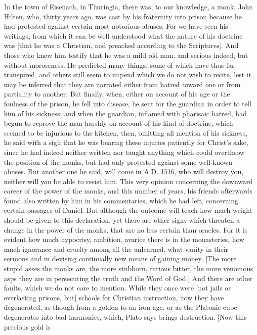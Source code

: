 In the town of Eisenach, in Thuringia, there was, to our knowledge, a
monk, John Hilten, who, thirty years ago, was cast by his fraternity
into prison because he had protested against certain most notorious
abuses.  For we have seen his writings, from which it can be well
understood what the nature of his doctrine was [that he was a
Christian, and preached according to the Scriptures].  And those who
knew him testify that he was a mild old man, and serious indeed, but
without moroseness.  He predicted many things, some of which have
thus far transpired, and others still seem to impend which we do not
wish to recite, lest it may be inferred that they are narrated either
from hatred toward one or from partiality to another.  But finally,
when, either on account of his age or the foulness of the prison, he
fell into disease, he sent for the guardian in order to tell him of
his sickness; and when the guardian, inflamed with pharisaic hatred,
had begun to reprove the man harshly on account of his kind of
doctrine, which seemed to be injurious to the kitchen, then, omitting
all mention of his sickness, he said with a sigh that he was bearing
these injuries patiently for Christ's sake, since he had indeed
neither written nor taught anything which could overthrow the
position of the monks, but had only protested against some well-known
abuses.  But another one he said, will come in A.D. 1516, who will
destroy you, neither will you be able to resist him.  This very
opinion concerning the downward career of the power of the monks, and
this number of years, his friends afterwards found also written by
him in his commentaries, which he had left, concerning certain
passages of Daniel.  But although the outcome will teach how much
weight should be given to this declaration, yet there are other signs
which threaten a change in the power of the monks, that are no less
certain than oracles.  For it is evident how much hypocrisy, ambition,
avarice there is in the monasteries, how much ignorance and cruelty
among all the unlearned, what vanity in their sermons and in devising
continually new means of gaining money.  [The more stupid asses the
monks are, the more stubborn, furious bitter, the more venomous asps
they are in persecuting the truth and the Word of God.] And there are
other faults, which we do not care to mention.  While they once were
[not jails or everlasting prisons, but] schools for Christian
instruction, now they have degenerated, as though from a golden to an
iron age, or as the Platonic cube degenerates into bad harmonies,
which, Plato says brings destruction.  [Now this precious gold is
